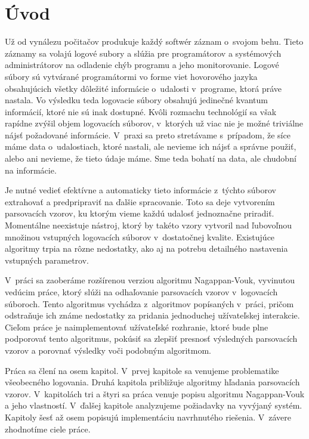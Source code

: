 \chapter*{Úvod}

Už od vynálezu počitačov produkuje každý softwér záznam o~svojom behu. Tieto záznamy sa volajú logové subory a slúžia pre programátorov a systémových administrátorov na odladenie chýb programu a jeho monitorovanie. Logové súbory sú vytvárané programátormi vo forme viet hovorového jazyka obsahujúcich všetky dôležité informácie o~udalosti v~programe, ktorá práve nastala. Vo výsledku teda logovacie súbory obsahujú jedinečné kvantum informácií, ktoré nie sú inak dostupné. Kvôli rozmachu technológií sa však rapídne zvýšil objem logovacích súborov, v~ktorých už viac nie je možné triviálne nájsť požadované informácie. V~praxi sa preto stretávame s~prípadom, že síce máme data o~udalostiach, ktoré nastali, ale nevieme ich nájsť a správne použiť, alebo ani nevieme, že tieto údaje máme. Sme teda bohatí na data, ale chudobní na informácie.
\par Je nutné vedieť efektívne a automaticky tieto informácie z~týchto súborov extrahovať a predpripraviť na ďalšie spracovanie. Toto sa deje vytvorením parsovacích vzorov, ku ktorým vieme každú udalosť jednoznačne priradiť. Momentálne neexistuje nástroj, ktorý by takéto vzory vytvoril nad ľubovoľnou množinou vstupných logovacích súborov v~dostatočnej kvalite. Existujúce algoritmy trpia na rôzne nedostatky, ako aj na potrebu detailného nastavenia vstupných parametrov.
\par V~práci sa zaoberáme rozšírenou verziou algoritmu Nagappan-Vouk, vyvinutou vedúcim práce, ktorý slúži na odhaľovanie parsovacích vzorov v~logovacích súboroch. Tento algoritmus vychádza z~algoritmov popísaných v~práci, pričom odstraňuje ich  známe nedostatky za pridania jednoduchej užívateľskej interakcie. Cieľom práce je naimplementovať užívateľské rozhranie, ktoré bude plne podporovať tento algoritmus, pokúsiť sa zlepšiť presnosť výsledných parsovacích vzorov a porovnať výsledky voči podobným algoritmom.
 \par Práca sa člení na osem kapitol. V~prvej kapitole sa venujeme problematike všeobecného logovania. Druhá kapitola približuje algoritmy hľadania parsovacích vzorov. V~kapitolách tri a štyri sa práca venuje popisu algoritmu Nagappan-Vouk a jeho vlastností. V~ďalšej kapitole analyzujeme požiadavky na vyvýjaný systém. Kapitoly šesť až osem popisujú implementáciu navrhnutého riešenia. V~závere zhodnotíme ciele práce.